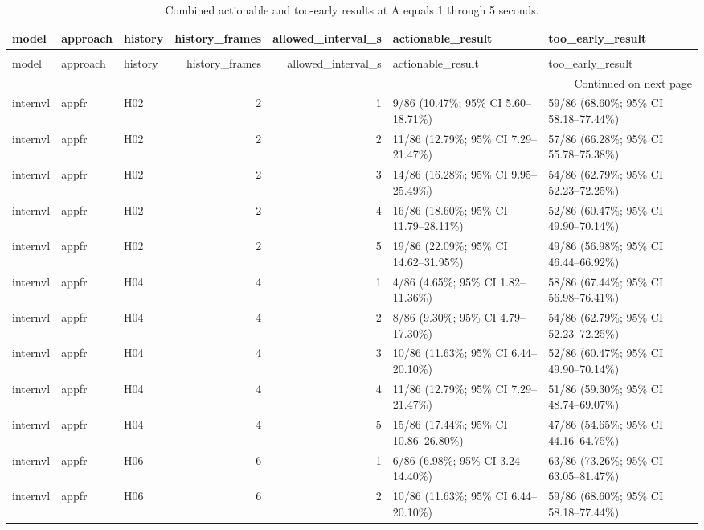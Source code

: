 \begin{longtable}{lllrrll}
\caption{Combined actionable and too-early results at A equals 1 through 5 seconds.} \label{tab:rq4-interval-dependent} \\
\toprule
model & approach & history & history\_frames & allowed\_interval\_s & actionable\_result & too\_early\_result \\
\midrule
\endfirsthead
\caption[]{Combined actionable and too-early results at A equals 1 through 5 seconds.} \\
\toprule
model & approach & history & history\_frames & allowed\_interval\_s & actionable\_result & too\_early\_result \\
\midrule
\endhead
\midrule
\multicolumn{7}{r}{Continued on next page} \\
\midrule
\endfoot
\bottomrule
\endlastfoot
internvl & appfr & H02 & 2 & 1 & 9/86 (10.47\%; 95\% CI 5.60–18.71\%) & 59/86 (68.60\%; 95\% CI 58.18–77.44\%) \\
internvl & appfr & H02 & 2 & 2 & 11/86 (12.79\%; 95\% CI 7.29–21.47\%) & 57/86 (66.28\%; 95\% CI 55.78–75.38\%) \\
internvl & appfr & H02 & 2 & 3 & 14/86 (16.28\%; 95\% CI 9.95–25.49\%) & 54/86 (62.79\%; 95\% CI 52.23–72.25\%) \\
internvl & appfr & H02 & 2 & 4 & 16/86 (18.60\%; 95\% CI 11.79–28.11\%) & 52/86 (60.47\%; 95\% CI 49.90–70.14\%) \\
internvl & appfr & H02 & 2 & 5 & 19/86 (22.09\%; 95\% CI 14.62–31.95\%) & 49/86 (56.98\%; 95\% CI 46.44–66.92\%) \\
internvl & appfr & H04 & 4 & 1 & 4/86 (4.65\%; 95\% CI 1.82–11.36\%) & 58/86 (67.44\%; 95\% CI 56.98–76.41\%) \\
internvl & appfr & H04 & 4 & 2 & 8/86 (9.30\%; 95\% CI 4.79–17.30\%) & 54/86 (62.79\%; 95\% CI 52.23–72.25\%) \\
internvl & appfr & H04 & 4 & 3 & 10/86 (11.63\%; 95\% CI 6.44–20.10\%) & 52/86 (60.47\%; 95\% CI 49.90–70.14\%) \\
internvl & appfr & H04 & 4 & 4 & 11/86 (12.79\%; 95\% CI 7.29–21.47\%) & 51/86 (59.30\%; 95\% CI 48.74–69.07\%) \\
internvl & appfr & H04 & 4 & 5 & 15/86 (17.44\%; 95\% CI 10.86–26.80\%) & 47/86 (54.65\%; 95\% CI 44.16–64.75\%) \\
internvl & appfr & H06 & 6 & 1 & 6/86 (6.98\%; 95\% CI 3.24–14.40\%) & 63/86 (73.26\%; 95\% CI 63.05–81.47\%) \\
internvl & appfr & H06 & 6 & 2 & 10/86 (11.63\%; 95\% CI 6.44–20.10\%) & 59/86 (68.60\%; 95\% CI 58.18–77.44\%) \\

\end{longtable}
